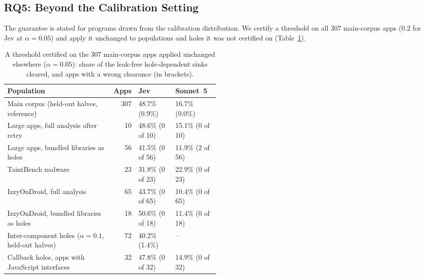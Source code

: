 
\subsection{RQ5: Beyond the Calibration Setting}
\label{sec:rq5}

The guarantee is stated for programs drawn from the calibration distribution.
We certify a threshold on all 307 main-corpus apps (0.2 for Jev at $\alpha=0.05$) and apply it unchanged to populations and holes it was not certified on (Table~\ref{tab:beyond}).

\begin{table}[t]
\caption{A threshold certified on the 307 main-corpus apps applied unchanged elsewhere ($\alpha=0.05$): share of the leak-free hole-dependent sinks cleared, and apps with a wrong clearance (in brackets).}
\label{tab:beyond}
\small
\begin{tabular}{@{}>{\raggedright\arraybackslash}p{0.5\linewidth}rll@{}}
\toprule
Population & Apps & Jev & Sonnet~5\\
\midrule
Main corpus (held-out halves, reference) & 307 & 48.7\% (0.9\%) & 16.7\% (0.0\%)\\
Large apps, full analysis after retry & 10 & 48.6\% (0 of 10) & 15.1\% (0 of 10)\\
Large apps, bundled libraries as holes & 56 & 41.5\% (0 of 56) & 11.9\% (2 of 56)\\
TaintBench malware & 23 & 31.8\% (0 of 23) & 22.9\% (0 of 23)\\
IzzyOnDroid, full analysis & 65 & 43.7\% (0 of 65) & 10.4\% (0 of 65)\\
IzzyOnDroid, bundled libraries as holes & 18 & 50.6\% (0 of 18) & 11.4\% (0 of 18)\\
Inter-component holes ($\alpha=0.1$, held-out halves) & 72 & 40.2\% (1.4\%) & --\\
Callback holes, apps with JavaScript interfaces & 32 & 47.8\% (0 of 32) & 14.9\% (0 of 32)\\
\bottomrule
\end{tabular}
\end{table}

